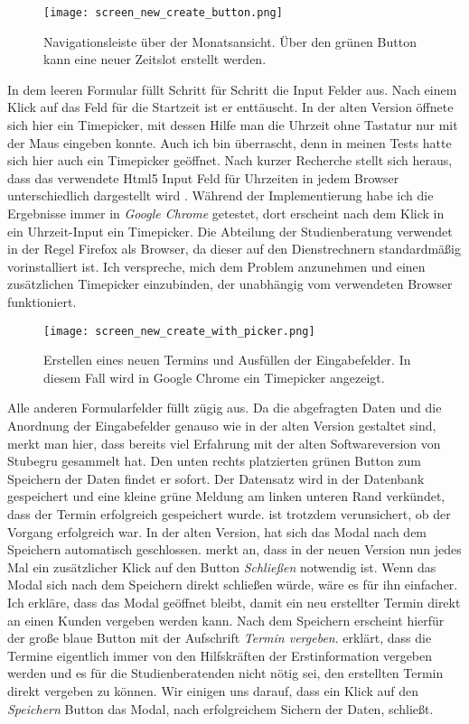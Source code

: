\begin{figure}[H]
    \caption{Navigationsleiste über der Monatsansicht. Über den grünen Button kann eine neuer Zeitslot erstellt werden.}
    \centering
    \texttt{[image: screen\_new\_create\_button.png]}
\end{figure}

In dem leeren Formular füllt \ipName Schritt für Schritt die Input Felder aus.
Nach einem Klick auf das Feld für die Startzeit ist er enttäuscht. In der alten
Version öffnete sich hier ein \gls{Timepicker}, mit dessen Hilfe man die Uhrzeit
ohne Tastatur nur mit der Maus eingeben konnte. Auch ich bin überrascht, denn
in meinen Tests hatte sich hier auch ein Timepicker geöffnet. Nach kurzer
Recherche stellt sich heraus, dass das verwendete Html5 Input Feld für
Uhrzeiten in jedem Browser unterschiedlich dargestellt
wird \cite{htmlTimeInput}. Während der Implementierung habe ich die Ergebnisse
immer in \textit{Google Chrome} getestet, dort erscheint nach dem Klick in ein
Uhrzeit-Input ein Timepicker. Die Abteilung der Studienberatung verwendet in
der Regel Firefox als Browser, da dieser auf den Dienstrechnern standardmäßig
vorinstalliert ist. Ich verspreche, mich dem Problem anzunehmen und einen
zusätzlichen Timepicker einzubinden, der unabhängig vom verwendeten Browser
funktioniert.

\begin{figure}[H]
    \caption{Erstellen eines neuen Termins und Ausfüllen der Eingabefelder. In diesem Fall wird in Google Chrome ein Timepicker angezeigt.}
    \centering
    \texttt{[image: screen\_new\_create\_with\_picker.png]}
\end{figure}

Alle anderen Formularfelder füllt \ipName zügig aus. Da die abgefragten Daten
und die Anordnung der Eingabefelder genauso wie in der alten Version gestaltet
sind, merkt man hier, dass \ipName bereits viel Erfahrung mit der alten
Softwareversion von Stubegru gesammelt hat. Den unten rechts platzierten grünen
Button zum Speichern der Daten findet er sofort. Der Datensatz wird in der
Datenbank gespeichert und eine kleine grüne Meldung am linken unteren Rand
verkündet, dass der Termin erfolgreich gespeichert wurde. \ipName ist trotzdem
verunsichert, ob der Vorgang erfolgreich war. In der alten Version, hat sich
das Modal nach dem Speichern automatisch geschlossen. \ipName merkt an, dass in
der neuen Version nun jedes Mal ein zusätzlicher Klick auf den Button
\textit{Schließen} notwendig ist. Wenn das Modal sich nach dem Speichern direkt
schließen würde, wäre es für ihn einfacher. Ich erkläre, dass das Modal
geöffnet bleibt, damit ein neu erstellter Termin direkt an einen Kunden
vergeben werden kann. Nach dem Speichern erscheint hierfür der große blaue
Button mit der Aufschrift \textit{Termin vergeben}. \ipName erklärt, dass die
Termine eigentlich immer von den Hilfskräften der Erstinformation vergeben
werden und es für die Studienberatenden nicht nötig sei, den erstellten Termin
direkt vergeben zu können. Wir einigen uns darauf, dass ein Klick auf den
\textit{Speichern} Button das Modal, nach erfolgreichem Sichern der Daten,
schließt.

